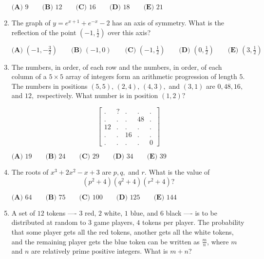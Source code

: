 \documentclass{article}
\begin{document}
\begin{enumerate}[label=\arabic*., itemsep=0.5em]
\(\textbf{(A) } 9 \qquad \textbf{(B) } 12 \qquad \textbf{(C) } 16 \qquad \textbf{(D) } 18 \qquad \textbf{(E) } 21\)\par \vspace{0.5em}\item The graph of \(y=e^{x+1}+e^{-x}-2\) has an axis of symmetry. What is the reflection of the point \((-1,\tfrac{1}{2})\) over this axis?

\(\textbf{(A) }\left(-1,-\frac{3}{2}\right)\qquad\textbf{(B) }(-1,0)\qquad\textbf{(C) }\left(-1,\tfrac{1}{2}\right)\qquad\textbf{(D) }\left(0,\frac{1}{2}\right)\qquad\textbf{(E) }\left(3,\frac{1}{2}\right)\)\par \vspace{0.5em}\item The numbers, in order, of each row and the numbers, in order, of each column of a \(5 \times 5\) array of integers form an arithmetic progression of length \(5{.}\) The numbers in positions \((5, 5), \,(2,4),\,(4,3),\) and \((3, 1)\) are \(0, 48, 16,\) and \(12{,}\) respectively. What number is in position \((1, 2)?\)

\begin{equation*}
\begin{bmatrix} . & ? &.&.&. \\ .&.&.&48&.\\ 12&.&.&.&.\\ .&.&16&.&.\\ .&.&.&.&0\end{bmatrix}
\end{equation*}

\(\textbf{(A) } 19 \qquad \textbf{(B) } 24 \qquad \textbf{(C) } 29 \qquad \textbf{(D) } 34 \qquad \textbf{(E) } 39\)\par \vspace{0.5em}\item The roots of \(x^3 + 2x^2 - x + 3\) are \(p, q,\) and \(r.\) What is the value of 
\begin{equation*}
(p^2 + 4)(q^2 + 4)(r^2 + 4)?
\end{equation*}

\(\textbf{(A) } 64 \qquad \textbf{(B) } 75 \qquad \textbf{(C) } 100 \qquad \textbf{(D) } 125 \qquad \textbf{(E) } 144\)\par \vspace{0.5em}\item A set of \(12\) tokens ---- \(3\) red, \(2\) white, \(1\) blue, and \(6\) black ---- is to be distributed at random to \(3\) game players, \(4\) tokens per player. The probability that some player gets all the red tokens, another gets all the white tokens, and the remaining player gets the blue token can be written as \(\frac{m}{n}\), where \(m\) and \(n\) are relatively prime positive integers. What is \(m+n\)?


\end{enumerate}
\end{document}
